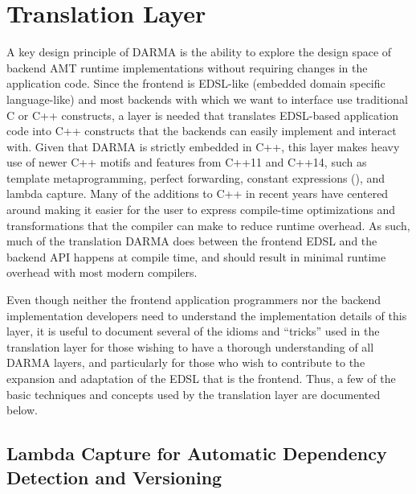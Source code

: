\chapter{Translation Layer}
\label{chap:middle_end}

A key design principle of DARMA is the ability to explore the design space of
backend AMT runtime implementations without requiring changes in the application
code.  Since the frontend is EDSL-like (embedded domain specific language-like)
and most backends with which we want to interface use traditional C or C++
constructs, a layer is needed that translates EDSL-based application code into
C++ constructs that the backends can easily implement and interact with.  Given
that DARMA is strictly embedded in C++, this layer makes heavy use of newer C++
motifs and features from C++11 and C++14, such as template metaprogramming,
perfect forwarding, constant expressions (), and lambda
capture.  Many of the additions to C++ in recent years have centered around
making it easier for the user to express compile-time optimizations and
transformations that the compiler can make to reduce runtime overhead.  As such,
much of the translation DARMA does between the frontend EDSL and the backend API
happens at compile time, and should result in minimal runtime overhead with most
modern compilers.

Even though neither the frontend application programmers nor the backend
implementation developers need to understand the implementation details of this
layer, it is useful to document several of the idioms and ``tricks'' used in the
translation layer for those wishing to have a thorough understanding of all
DARMA layers, and particularly for those who wish to contribute to the expansion
and adaptation of the EDSL that is the frontend.  Thus, a few of the basic
techniques and concepts used by the translation layer are documented below.

\section{Lambda Capture for Automatic Dependency Detection and Versioning}

